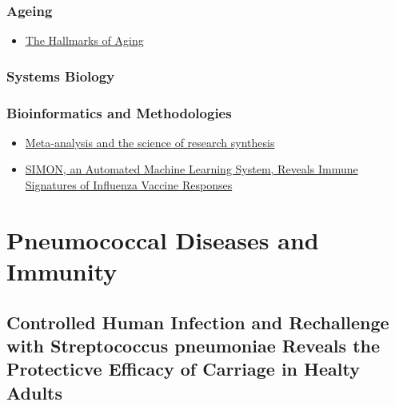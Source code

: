 \documentclass[
]{book}
\providecommand{\tightlist}{%
  \setlength{\itemsep}{0pt}\setlength{\parskip}{0pt}}
\begin{document}
\hypertarget{ageing}{%
\subsection{Ageing}\label{ageing}}

\begin{itemize}
\tightlist
\item
  \href{https://www.cell.com/fulltext/S0092-8674(13)00645-4}{The Hallmarks of Aging}
\end{itemize}

\hypertarget{systems-biology}{%
\subsection{Systems Biology}\label{systems-biology}}

\hypertarget{bioinformatics-and-methodologies}{%
\subsection{Bioinformatics and Methodologies}\label{bioinformatics-and-methodologies}}

\begin{itemize}
\tightlist
\item
  \href{https://www.nature.com/articles/nature25753}{Meta-analysis and the science of research synthesis}
\end{itemize}

\begin{itemize}
\tightlist
\item
  \href{https://pubmed.ncbi.nlm.nih.gov/31201239/}{SIMON, an Automated Machine Learning System, Reveals Immune Signatures of Influenza Vaccine Responses}
\end{itemize}

\hypertarget{pneumococcal-diseases-and-immunity}{%
\chapter{Pneumococcal Diseases and Immunity}\label{pneumococcal-diseases-and-immunity}}

\hypertarget{controlled-human-infection-and-rechallenge-with-streptococcus-pneumoniae-reveals-the-protecticve-efficacy-of-carriage-in-healty-adults}{%
\section{Controlled Human Infection and Rechallenge with Streptococcus pneumoniae Reveals the Protecticve Efficacy of Carriage in Healty Adults}\label{controlled-human-infection-and-rechallenge-with-streptococcus-pneumoniae-reveals-the-protecticve-efficacy-of-carriage-in-healty-adults}}
\end{document}
